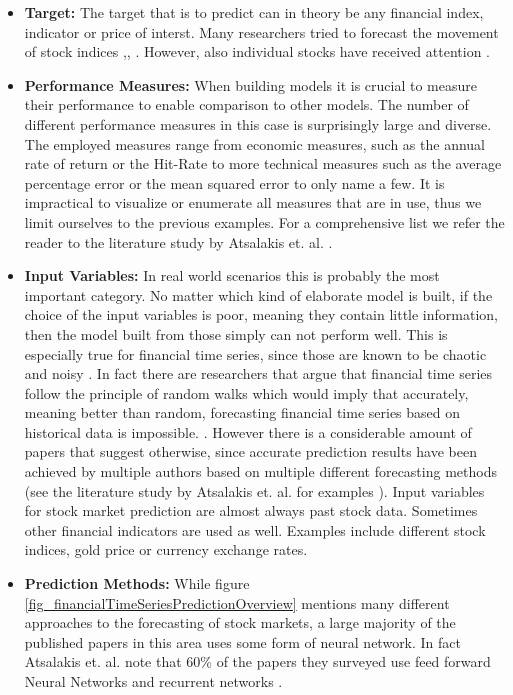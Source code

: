 \begin{itemize}
	\item \textbf{Target:} The target that is to predict can in theory be any financial index, indicator or price of interst. Many researchers tried to forecast the movement of stock indices \cite{zhang2009stock},\cite{van2001financial}, \cite{kumar2006forecasting} . However, also individual stocks have received attention \cite{mahfoud1996financial}. 
	\item \textbf{Performance Measures:} When building models it is crucial to measure their performance to enable comparison to other models. The number of different performance measures in this case is surprisingly large and diverse. The employed measures range from economic measures, such as the annual rate of return or the Hit-Rate to more technical measures such as the average percentage error or the mean squared error to only name a few. It is impractical to visualize or enumerate all measures that are in use, thus we limit ourselves to the previous examples. For a comprehensive list we refer the reader to the literature study by Atsalakis et. al. \cite{atsalakis2009surveying}.
	\item \textbf{Input Variables:} In real world scenarios this is probably the most important category. No matter which kind of elaborate model is built, if the choice of the input variables is poor, meaning they contain little information, then the model built from those simply can not perform well. This is especially true for financial time series, since those are known to be chaotic and noisy \cite{zhang2009stock}. In fact there are researchers that argue that financial time series follow the principle of random walks which would imply that accurately, meaning better than random, forecasting financial time series based on historical data is impossible. \cite{fama1965behavior}. However there is a considerable amount of papers that suggest otherwise, since accurate prediction results have been achieved by multiple authors based on multiple different forecasting methods (see the literature study by Atsalakis et. al. for examples \cite{atsalakis2009surveying} ). Input variables for stock market prediction are almost always past stock data. Sometimes other financial indicators are used as well. Examples include different stock indices, gold price or currency exchange rates.
	\item \textbf{Prediction Methods:} While figure \ref{fig_financialTimeSeriesPredictionOverview} mentions many different approaches to the forecasting of stock markets, a large majority of the published papers in this area uses some form of neural network. In fact Atsalakis et. al. note that 60\% of the papers they surveyed use feed forward Neural Networks and recurrent networks \cite{atsalakis2009surveying}. 
\end{itemize}

